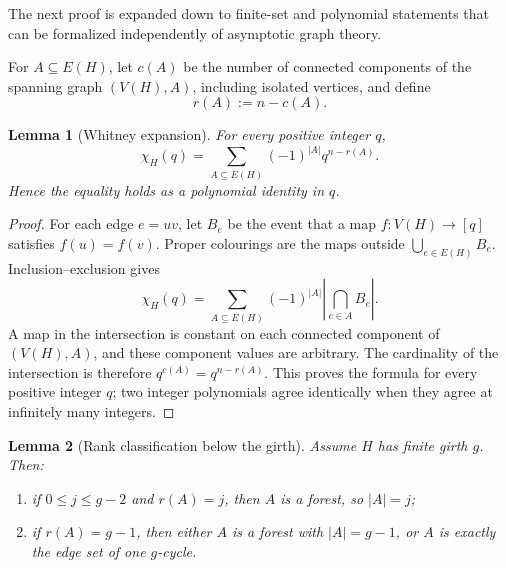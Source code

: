 \documentclass[11pt]{article}
\newtheorem{lemma}{Lemma}
\begin{document}
The next proof is expanded down to finite-set and polynomial statements
that can be formalized independently of asymptotic graph theory.

For \(A\subseteq E(H)\), let \(c(A)\) be the number of connected
components of the spanning graph \((V(H),A)\), including isolated
vertices, and define
\[
    r(A):=n-c(A).
\]

\begin{lemma}[Whitney expansion]\label{lem:whitney}
For every positive integer \(q\),
\[
    \chi_H(q)
    =
    \sum_{A\subseteq E(H)}(-1)^{|A|}q^{n-r(A)}.
\]
Hence the equality holds as a polynomial identity in \(q\).
\end{lemma}

\begin{proof}
For each edge \(e=uv\), let \(B_e\) be the event that a map
\(f\colon V(H)\to[q]\) satisfies \(f(u)=f(v)\).  Proper colourings are
the maps outside \(\bigcup_{e\in E(H)}B_e\).  Inclusion--exclusion gives
\[
    \chi_H(q)
    =
    \sum_{A\subseteq E(H)}(-1)^{|A|}
      \left|\bigcap_{e\in A}B_e\right|.
\]
A map in the intersection is constant on each connected component of
\((V(H),A)\), and these component values are arbitrary.  The cardinality
of the intersection is therefore \(q^{c(A)}=q^{n-r(A)}\).  This proves
the formula for every positive integer \(q\); two integer polynomials
agree identically when they agree at infinitely many integers.
\end{proof}

\begin{lemma}[Rank classification below the girth]\label{lem:rank-classification}
Assume \(H\) has finite girth \(g\).  Then:
\begin{enumerate}
    \item if \(0\le j\le g-2\) and \(r(A)=j\), then \(A\) is a forest,
    so \(|A|=j\);
    \item if \(r(A)=g-1\), then either \(A\) is a forest with
    \(|A|=g-1\), or \(A\) is exactly the edge set of one \(g\)-cycle.
\end{enumerate}
\end{lemma}
\end{document}

